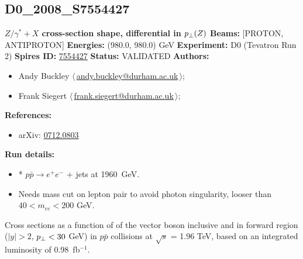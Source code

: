 \subsection[D0\_2008\_S7554427]{D0\_2008\_S7554427\,\cite{:2007nt}}
\textbf{$Z/\gamma^* + X$ cross-section shape, differential in $p_\perp(Z)$}\newline
\textbf{Beams:} [PROTON, ANTIPROTON] \newline
\textbf{Energies:} (980.0, 980.0) GeV \newline
\textbf{Experiment:} D0 (Tevatron Run 2) \newline
\textbf{Spires ID:} \href{http://www.slac.stanford.edu/spires/find/hep/www?rawcmd=key+7554427}{7554427}\newline
\textbf{Status:} VALIDATED\newline
\textbf{Authors:}
\begin{itemize}
  \item Andy Buckley $\langle\,$\href{mailto:andy.buckley@durham.ac.uk}{andy.buckley@durham.ac.uk}$\,\rangle$;
  \item Frank Siegert $\langle\,$\href{mailto:frank.siegert@durham.ac.uk}{frank.siegert@durham.ac.uk}$\,\rangle$;
\end{itemize}
\textbf{References:}
\begin{itemize}
  \item arXiv: \href{http://arxiv.org/abs/0712.0803}{0712.0803}
\end{itemize}
\textbf{Run details:}
\begin{itemize}

  \item * $p \bar{p} \to e^+ e^-$ + jets at 1960~GeV.
  \item Needs mass cut on lepton pair to avoid photon singularity, looser than $40 < m_{ee} < 200$ GeV.\end{itemize}

\noindent Cross sections as a function of \pT of the vector boson inclusive and in forward region ($|y| > 2$, $p_\perp<30$ GeV) in $p \bar{p}$ collisions at $\sqrt{s}$ = 1.96 TeV, based on an integrated luminosity of 0.98~fb$^{-1}$.

\clearpage


\clearpage

